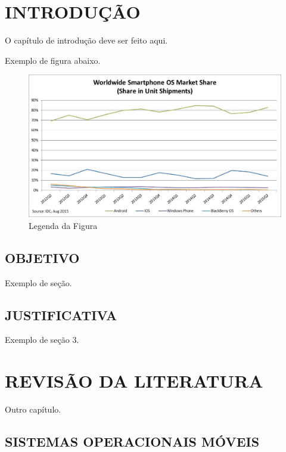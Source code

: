 \documentclass[
	12pt,				%
	openright,			%
	oneside,			%
	a4paper,			%
	chapter=TITLE,		%
	section=TITLE,		%
	english,			%
	french,				%
	spanish,			%
	brazil				%
	]{abntex2}
\begin{document}
\chapter{INTRODUÇÃO}
	
	O capítulo de introdução deve ser feito aqui.

	Exemplo de figura abaixo.
	\begin{figure}[H]
  		\begin{center}
    		\caption{Legenda da Figura}
    		\label{fig-exemplo}
    		\includegraphics [scale=0.6]{imagens/smartphone-os-market-share.png}
  		\end{center}
	\end{figure}

\section{OBJETIVO} 
	
	Exemplo de seção.


\section{JUSTIFICATIVA}
	Exemplo de seção 3.

\chapter{REVISÃO DA LITERATURA}
	
	Outro capítulo.

\section{SISTEMAS OPERACIONAIS MÓVEIS} %
	
\end{document}
